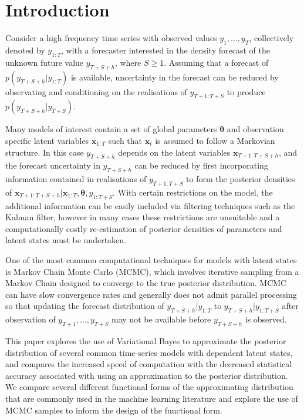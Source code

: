 \documentclass[12pt,a4paper]{article}%
\numberwithin{equation}{section}
\begin{document}
\section{Introduction}

Consider a high frequency time series with observed values $y_{1}, \dots, y_{T}$, collectively denoted by $y_{1:T}$, with a forecaster interested in the density forecast of the unknown future value $y_{T+S+h}$, where $S \geq 1$. Assuming that a forecast of $p(y_{T+S+h} | y_{1:T})$ is available, uncertainty in the forecast can be reduced by observating and conditioning on the realisations of $y_{T+1:T+S}$ to produce $p(y_{T+S+h} | y_{T+S})$. 

Many models of interest contain a set of global parameters $\boldsymbol{\theta}$ and observation specific latent variables $\textbf{x}_{1:T}$ such that $\textbf{x}_t$ is assumed to follow a Markovian structure. In this case $y_{T+S+h}$ depends on the latent variables $\textbf{x}_{T+1:T+S+h}$, and the forecast uncertainty in $y_{T+S+h}$ can be reduced by first incorporating information contained in realisations of $y_{T+1:T+S}$ to form the posterior densities of $\textbf{x}_{T+1:T+S+h} | \textbf{x}_{1:T}, \boldsymbol{\theta}, y_{1:T+S}$. With certain restrictions on the model, the additional information can be easily included via filtering techniques such as the Kalman filter, however in many cases these restrictions are unsuitable and a computationally costly re-estimation of posterior densities of parameters and latent states must be undertaken.

One of the most common computational techniques for models with latent states is Markov Chain Monte Carlo (MCMC), which involves iterative sampling from a Markov Chain designed to converge to the true posterior distribution. MCMC can have slow convergence rates and generally does not admit parallel processing so that updating the forecast distribution of $y_{T+S+h} | y_{1:T}$ to $y_{T+S+h} | y_{1:T+S}$ after observation of $y_{T+1}, \dots, y_{T+S}$ may not be available before $y_{T+S+h}$ is observed.

This paper explores the use of Variational Bayes to approximate the posterior distribution of several common time-series models with dependent latent states, and compares the increased speed of computation with the decreased statistical accuracy associated with using an approximation to the posterior distribution. We compare several different functional forms of the approximating distribution that are commonly used in the machine learning literature and explore the use of MCMC samples to inform the design of the functional form.
\end{document}
